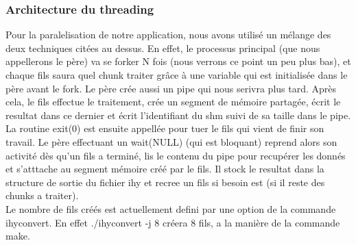 \documentclass[a4paper,12pt]{article}
\begin{document}
		\subsubsection{Architecture du threading}
Pour la paralelisation de notre application, nous avons utilis\'e un m\'elange des deux techniques cit\'ees au dessus. En effet, le processus principal (que nous appellerons le p\`ere) va se forker N fois (nous verrons ce point un peu plus bas), et chaque fils saura quel chunk traiter gr\^ace \`a une variable qui est initialis\'ee dans le p\`ere avant le fork. Le p\`ere cr\'ee aussi un pipe qui nous serivra plus tard. Apr\`es cela, le fils effectue le traitement, cr\'ee un segment de m\'emoire partag\'ee, \'ecrit le resultat dans ce dernier et \'ecrit l'identifiant du shm suivi de sa taille dans le pipe. La routine exit(0) est ensuite appell\'ee pour tuer le fils qui vient de finir son travail. Le p\`ere effectuant un wait(NULL) (qui est bloquant) reprend alors son activit\'e d\`es qu'un fils a termin\'e, lis le contenu du pipe pour recup\'erer les donn\'es et s'atttache au segment m\'emoire cr\'e\'e par le fils. Il stock le resultat dans la structure de sortie du fichier ihy et recree un fils si besoin est (si il reste des chunks a traiter).\\
Le nombre de fils cr\'e\'es est actuellement defini par une option de la commande ihyconvert. En effet ./ihyconvert -j 8 cr\'eera 8 fils, a la mani\`ere de la commande make.
\end{document}
